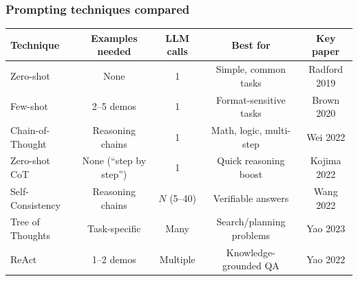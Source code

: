 \documentclass[aspectratio=169]{beamer}
\begin{document}
\begin{frame}
\frametitle{Prompting techniques compared}

\vspace{-0.1cm}
\renewcommand{\arraystretch}{1.3}
\begin{center}
{\scriptsize
\begin{tabular}{l c c c c}
  \textbf{Technique} & \textbf{Examples needed} & \textbf{LLM calls} & \textbf{Best for} & \textbf{Key paper} \\
  \hline
  Zero-shot & None & 1 & Simple, common tasks & Radford 2019 \\[1pt]
  Few-shot & 2--5 demos & 1 & Format-sensitive tasks & Brown 2020 \\[1pt]
  Chain-of-Thought & Reasoning chains & 1 & Math, logic, multi-step & Wei 2022 \\[1pt]
  Zero-shot CoT & None (``step by step'') & 1 & Quick reasoning boost & Kojima 2022 \\[1pt]
  Self-Consistency & Reasoning chains & $N$ (5--40) & Verifiable answers & Wang 2022 \\[1pt]
  Tree of Thoughts & Task-specific & Many & Search/planning problems & Yao 2023 \\[1pt]
  ReAct & 1--2 demos & Multiple & Knowledge-grounded QA & Yao 2022 \\
  \hline
\end{tabular}
}
\end{center}

\vspace{0.2cm}
\begin{center}
\end{center}
\end{frame}
\end{document}

